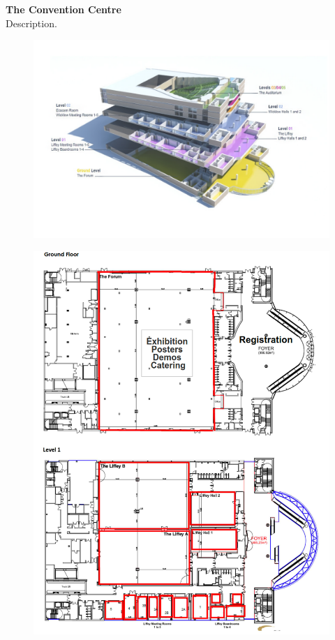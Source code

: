 \normalsize
\vspace*{-8mm}
 {\Large \textbf{The Convention Centre}}\\\leavevmode\newline
Description.

\begin{figure}[h!]
  \centering
      \includegraphics[width=0.9\linewidth]{examples/handbook_coling25/venue_map/floor.png}
 \end{figure}
  \begin{figure}[h!]
  \centering
      \includegraphics[width=0.49\linewidth]{examples/handbook_coling25/venue_map/ACL 2022 - CCD Floorplan_1.png}
 \end{figure}
